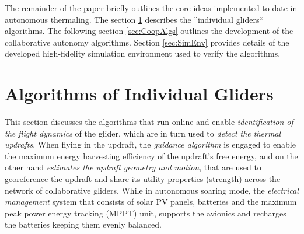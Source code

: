 \documentclass{ifacconf}
\newcommand{\squeezeup}{\vspace{-3.0mm}}
\begin{document}
The remainder of the paper briefly outlines the core ideas implemented to
date in autonomous thermaling. The section \ref{sec:IndAlgs} describes the
''individual gliders`` algorithms. The following section \ref{sec:CoopAlgs}
outlines the development of the collaborative autonomy algorithms. Section
\ref{sec:SimEnv} provides details of the developed high-fidelity simulation
environment used to verify the algorithms. \squeezeup

\section{ Algorithms of Individual Gliders}
\label{sec:IndAlgs} \squeezeup This section discusses the algorithms that run
online and enable \emph{identification of the flight dynamics} of the glider,
which are in turn used to \emph{detect the thermal updrafts}. When flying in
the updraft, the \emph{guidance algorithm} is engaged to enable the maximum
energy harvesting efficiency of the updraft's free energy, and on the other
hand \emph{estimates the updraft geometry and motion}, that are used to
georeference the updraft and share its utility properties (strength) across
the network of collaborative gliders.
%
%
While in autonomous soaring mode, the \emph{electrical management} system
that consists of solar PV panels, batteries and the maximum peak power energy
tracking (MPPT) unit, supports the avionics and recharges the batteries
keeping them evenly balanced.\squeezeup

%
\end{document}
